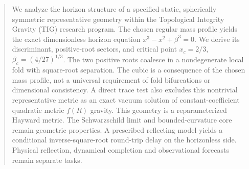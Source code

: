 \begin{abstract}
We analyze the horizon structure of a specified static, spherically symmetric
representative geometry within the Topological Integrity Gravity (TIG) research
program. The chosen regular mass profile yields the exact dimensionless horizon
equation \(x^3-x^2+\beta^3=0\). We derive its discriminant, positive-root sectors,
and critical point \(x_c=2/3\), \(\beta_c=(4/27)^{1/3}\). The two positive roots
coalesce in a nondegenerate local fold with square-root separation. The cubic
is a consequence of the chosen mass profile, not a universal requirement of
fold bifurcations or dimensional consistency. A direct trace test also excludes
this nontrivial representative metric as an exact vacuum solution of
constant-coefficient quadratic metric \(f(R)\) gravity. This geometry is a reparameterized Hayward metric.
The Schwarzschild limit and bounded-curvature core remain geometric properties.
A prescribed reflecting model yields a conditional inverse-square-root
round-trip delay on the horizonless side. Physical reflection, dynamical
completion and observational forecasts remain separate tasks.
\end{abstract}
